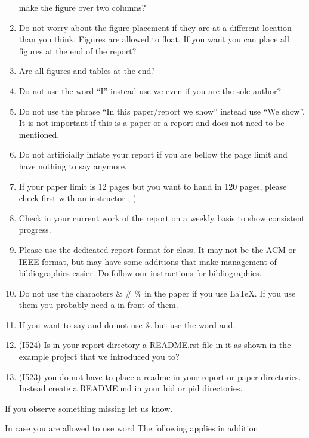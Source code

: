 \begin{enumerate}
  make the figure over two columns?
\item
  Do not worry about the figure placement if they are at a different
  location than you think. Figures are allowed to float. If you want you
  can place all figures at the end of the report?
\item
  Are all figures and tables at the end?
\item
  Do not use the word ``I'' instead use we even if you are the sole
  author?
\item
  Do not use the phrase ``In this paper/report we show'' instead use
  ``We show''. It is not important if this is a paper or a report and
  does not need to be mentioned.
\item
  Do not artificially inflate your report if you are bellow the page
  limit and have nothing to say anymore.
\item
  If your paper limit is 12 pages but you want to hand in 120 pages,
  please check first with an instructor ;-)
\item
  Check in your current work of the report on a weekly basis to show
  consistent progress.
\item
  Please use the dedicated report format for class. It may not be the
  ACM or IEEE format, but may have some additions that make management
  of bibliographies easier. Do follow our instructions for
  bibliographies.
\item
  Do not use the characters \& \# \% in the paper if you use LaTeX. If
  you use them you probably need a in front of them.
\item
  If you want to say and do not use \& but use the word and.
\item
  (I524) Is in your report directory a README.rst file in it as shown in
  the example project that we introduced you to?
\item
  (I523) you do not have to place a readme in your report or paper
  directories. Instead create a README.md in your hid or pid
  directories.
\end{enumerate}

If you observe something missing let us know.

In case you are allowed to use word The following applies in addition

